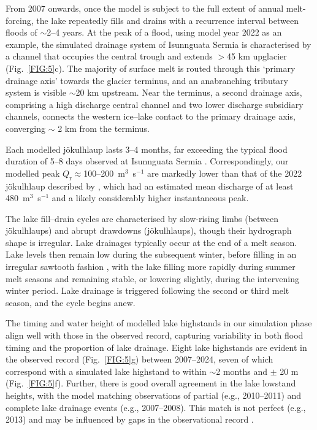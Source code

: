 \documentclass[tc, manuscript]{copernicus}
\begin{document}
From 2007 onwards, once the model is subject to the full extent of annual melt-forcing, the lake repeatedly fills and drains with a recurrence interval between floods of $\sim$2--4 years. At the peak of a flood, using model year 2022 as an example, the simulated drainage system of Isunnguata Sermia is characterised by a channel that occupies the central trough and extends $>$45 km upglacier (Fig.~\ref{FIG:5}c). The majority of surface melt is routed through this `primary drainage axis' towards the glacier terminus, and an anabranching tributary system is visible $\sim$20 km upstream. Near the terminus, a second drainage axis, comprising a high discharge central channel and two lower discharge subsidiary channels, connects the western ice--lake contact to the primary drainage axis, converging $\sim$ 2 km from the terminus.

Each modelled jökulhlaup lasts 3--4 months, far exceeding the typical flood duration of 5--8 days observed at Isunnguata Sermia \citep{livingstone2025ice}. Correspondingly, our modelled peak $Q_{\mathrm{r}}\approx$100--200~m$^{3}$~s$^{-1}$ are markedly lower than that of the 2022 jökulhlaup described by \citet{livingstone2025ice}, which had an estimated mean discharge of at least 480~m$^{3}$~s$^{-1}$ and a likely considerably higher instantaneous peak.

The lake fill--drain cycles are characterised by slow-rising limbs (between jökulhlaups) and abrupt drawdowns (jökulhlaups), though their hydrograph shape is irregular. Lake drainages typically occur at the end of a melt season. Lake levels then remain low during the subsequent winter, before filling in an irregular sawtooth fashion \citep[as in][]{ng2009temporal}, with the lake filling more rapidly during summer melt seasons and remaining stable, or lowering slightly, during the intervening winter period. Lake drainage is triggered following the second or third melt season, and the cycle begins anew. 

The timing and water height of modelled lake highstands in our simulation phase align well with those in the observed record, capturing variability in both flood timing and the proportion of lake drainage. Eight lake highstands are evident in the observed record (Fig.~\ref{FIG:5}g) between 2007--2024, seven of which correspond with a simulated lake highstand to within $\sim$2 months and $\pm$ 20 m (Fig.~\ref{FIG:5}f). Further, there is good overall agreement in the lake lowstand heights, with the model matching observations of partial (e.g., 2010--2011) and complete lake drainage events (e.g., 2007--2008). This match is not perfect (e.g., 2013) and may be influenced by gaps in the observational record \citep{livingstone2025ice}. 
\end{document}
